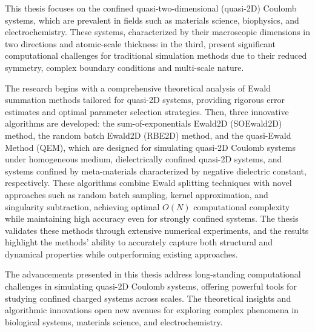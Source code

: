 This thesis focuses on the confined quasi-two-dimensional (quasi-2D) Coulomb systems, which are prevalent in fields such as materials science, biophysics, and electrochemistry. 
These systems, characterized by their macroscopic dimensions in two directions and atomic-scale thickness in the third, present significant computational challenges for traditional simulation methods due to their reduced symmetry, complex boundary conditions and multi-scale nature.

The research begins with a comprehensive theoretical analysis of Ewald summation methods tailored for quasi-2D systems, providing rigorous error estimates and optimal parameter selection strategies. 
Then, three innovative algorithms are developed: the sum-of-exponentials Ewald2D (SOEwald2D) method, the random batch Ewald2D (RBE2D) method, and the quasi-Ewald Method (QEM), which are designed for simulating quasi-2D Coulomb systems under homogeneous medium, dielectrically confined quasi-2D systems, and systems confined by meta-materials characterized by negative dielectric constant, respectively.
These algorithms combine Ewald splitting techniques with novel approaches such as random batch sampling, kernel approximation, and singularity subtraction, achieving optimal $O(N)$ computational complexity while maintaining high accuracy even for strongly confined systems.
The thesis validates these methods through extensive numerical experiments, and the results highlight the methods' ability to accurately capture both structural and dynamical properties while outperforming existing approaches.



The advancements presented in this thesis address long-standing computational challenges in simulating quasi-2D Coulomb systems, offering powerful tools for studying confined charged systems across scales. 
The theoretical insights and algorithmic innovations open new avenues for exploring complex phenomena in biological systems, materials science, and electrochemistry.